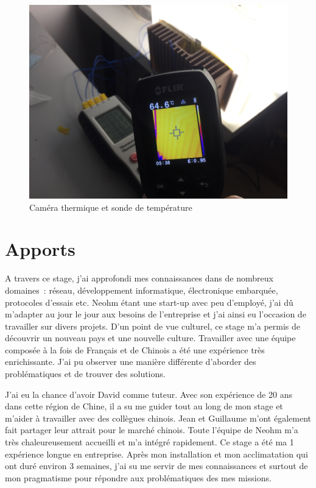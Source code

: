 \documentclass[a4paper, 12pt, sffamily]{report}
\begin{document}
\begin{figure}[H]
\centering
\includegraphics[scale=0.08]{figures/photos/thermal_camera.jpg}
\caption{Caméra thermique et sonde de température}
\label{fig:temp_test}
\end{figure}



\chapter{Apports}

A travers ce stage, j'ai approfondi mes connaissances dans de nombreux domaines~: réseau, développement informatique, électronique embarquée, protocoles d'essais etc. Neohm étant une start-up avec peu d'employé, j'ai dû m'adapter au jour le jour aux besoins de l'entreprise et j'ai ainsi eu l'occasion de travailler sur divers projets. D'un point de vue culturel, ce stage m'a permis de découvrir un nouveau pays et une nouvelle culture. Travailler avec une équipe composée à la fois de Français et de Chinois a été une expérience très enrichissante. J'ai pu observer une manière différente d'aborder des problématiques et de trouver des solutions.

J'ai eu la chance d'avoir David comme tuteur. Avec son expérience de 20 ans dans cette région de Chine, il a su me guider tout au long de mon stage et m'aider à travailler avec des collègues chinois. Jean et Guillaume m'ont également fait partager leur attrait pour le marché chinois. Toute l'équipe de Neohm m'a très chaleureusement accueilli et m'a intégré rapidement.
Ce stage a été ma 1\ieme{} expérience longue en entreprise. Après mon installation et mon acclimatation qui ont duré environ 3 semaines, j'ai su me servir de mes connaissances et surtout de mon pragmatisme pour répondre aux problématiques des mes missions.
\end{document}
